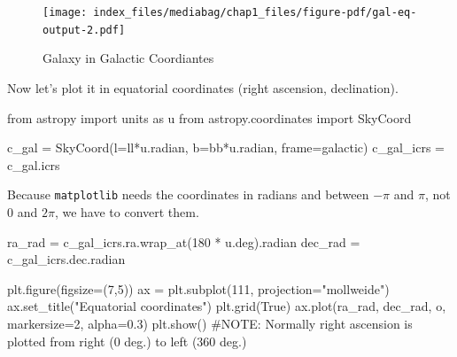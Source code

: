 \documentclass[
  letterpaper,
  DIV=11,
  numbers=noendperiod]{scrreprt}
\newenvironment{Shaded}{\begin{snugshade}}{\end{snugshade}}
\newcommand{\CommentTok}[1]{\textcolor[rgb]{0.37,0.37,0.37}{#1}}
\newcommand{\DecValTok}[1]{\textcolor[rgb]{0.68,0.00,0.00}{#1}}
\newcommand{\FloatTok}[1]{\textcolor[rgb]{0.68,0.00,0.00}{#1}}
\newcommand{\ImportTok}[1]{\textcolor[rgb]{0.00,0.46,0.62}{#1}}
\newcommand{\NormalTok}[1]{\textcolor[rgb]{0.00,0.23,0.31}{#1}}
\newcommand{\OperatorTok}[1]{\textcolor[rgb]{0.37,0.37,0.37}{#1}}
\newcommand{\StringTok}[1]{\textcolor[rgb]{0.13,0.47,0.30}{#1}}
\newcommand{\VariableTok}[1]{\textcolor[rgb]{0.07,0.07,0.07}{#1}}
\begin{document}
\begin{figure}[H]

{\centering \texttt{[image: index\_files/mediabag/chap1\_files/figure-pdf/gal-eq-output-2.pdf]}

}

\caption{Galaxy in Galactic Coordiantes}

\end{figure}%

Now let's plot it in equatorial coordinates (right ascension,
declination).

\begin{Shaded}
\begin{Highlighting}[]
\ImportTok{from}\NormalTok{ astropy }\ImportTok{import}\NormalTok{ units }\ImportTok{as}\NormalTok{ u}
\ImportTok{from}\NormalTok{ astropy.coordinates }\ImportTok{import}\NormalTok{ SkyCoord}

\NormalTok{c\_gal }\OperatorTok{=}\NormalTok{ SkyCoord(l}\OperatorTok{=}\NormalTok{ll}\OperatorTok{*}\NormalTok{u.radian, b}\OperatorTok{=}\NormalTok{bb}\OperatorTok{*}\NormalTok{u.radian, frame}\OperatorTok{=}\StringTok{\textquotesingle{}galactic\textquotesingle{}}\NormalTok{)}
\NormalTok{c\_gal\_icrs }\OperatorTok{=}\NormalTok{ c\_gal.icrs}
\end{Highlighting}
\end{Shaded}

Because \texttt{matplotlib} needs the coordinates in radians and between
\(-\pi\) and \(\pi\), not 0 and \(2\pi\), we have to convert them.

\begin{Shaded}
\begin{Highlighting}[]
\NormalTok{ra\_rad }\OperatorTok{=}\NormalTok{ c\_gal\_icrs.ra.wrap\_at(}\DecValTok{180} \OperatorTok{*}\NormalTok{ u.deg).radian}
\NormalTok{dec\_rad }\OperatorTok{=}\NormalTok{ c\_gal\_icrs.dec.radian}

\NormalTok{plt.figure(figsize}\OperatorTok{=}\NormalTok{(}\DecValTok{7}\NormalTok{,}\DecValTok{5}\NormalTok{))}
\NormalTok{ax }\OperatorTok{=}\NormalTok{ plt.subplot(}\DecValTok{111}\NormalTok{, projection}\OperatorTok{=}\StringTok{"mollweide"}\NormalTok{)}
\NormalTok{ax.set\_title(}\StringTok{"Equatorial coordinates"}\NormalTok{)}
\NormalTok{plt.grid(}\VariableTok{True}\NormalTok{)}
\NormalTok{ax.plot(ra\_rad, dec\_rad, }\StringTok{\textquotesingle{}o\textquotesingle{}}\NormalTok{, markersize}\OperatorTok{=}\DecValTok{2}\NormalTok{, alpha}\OperatorTok{=}\FloatTok{0.3}\NormalTok{)}
\NormalTok{plt.show()}
\CommentTok{\#NOTE: Normally right ascension is plotted from right (0 deg.) to left (360 deg.)}
\end{Highlighting}
\end{Shaded}
\end{document}
